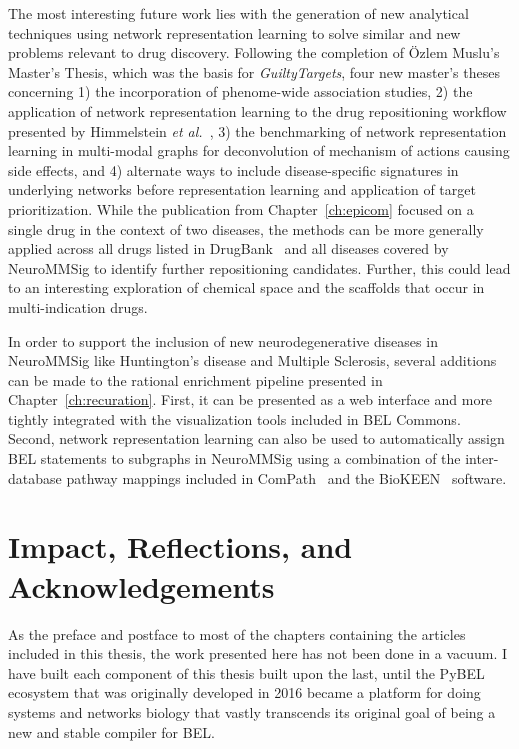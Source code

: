 The most interesting future work lies with the generation of new analytical techniques using network representation learning to solve similar and new problems relevant to drug discovery.
Following the completion of \"{O}zlem Muslu's Master's Thesis, which was the basis for \textit{GuiltyTargets}, four new master's theses concerning 1) the incorporation of phenome-wide association studies, 2) the application of network representation learning to the drug repositioning workflow presented by Himmelstein \textit{et al.}~\cite{Himmelstein2017}, 3) the benchmarking of network representation learning in multi-modal graphs for deconvolution of mechanism of actions causing side effects, and 4) alternate ways to include disease-specific signatures in underlying networks before representation learning and application of target prioritization.
While the publication from Chapter~\ref{ch:epicom} focused on a single drug in the context of two diseases, the methods can be more generally applied across all drugs listed in DrugBank~\cite{Wishart2018} and all diseases covered by NeuroMMSig to identify further repositioning candidates.
Further, this could lead to an interesting exploration of chemical space and the scaffolds that occur in multi-indication drugs.

In order to support the inclusion of new neurodegenerative diseases in NeuroMMSig like Huntington's disease and Multiple Sclerosis, several additions can be made to the rational enrichment pipeline presented in Chapter~\ref{ch:recuration}.
First, it can be presented as a web interface and more tightly integrated with the visualization tools included in BEL Commons.
Second, network representation learning can also be used to automatically assign \ac{BEL} statements to subgraphs in NeuroMMSig using a combination of the inter-database pathway mappings included in ComPath~\cite{Domingo-Fernandez2018} and the BioKEEN~\cite{Ali2019} software.

\section{Impact, Reflections, and Acknowledgements}

As the preface and postface to most of the chapters containing the articles included in this thesis, the work presented here has not been done in a vacuum.
I have built each component of this thesis built upon the last, until the PyBEL ecosystem that was originally developed in 2016 became a platform for doing systems and networks biology that vastly transcends its original goal of being a new and stable compiler for \ac{BEL}.

